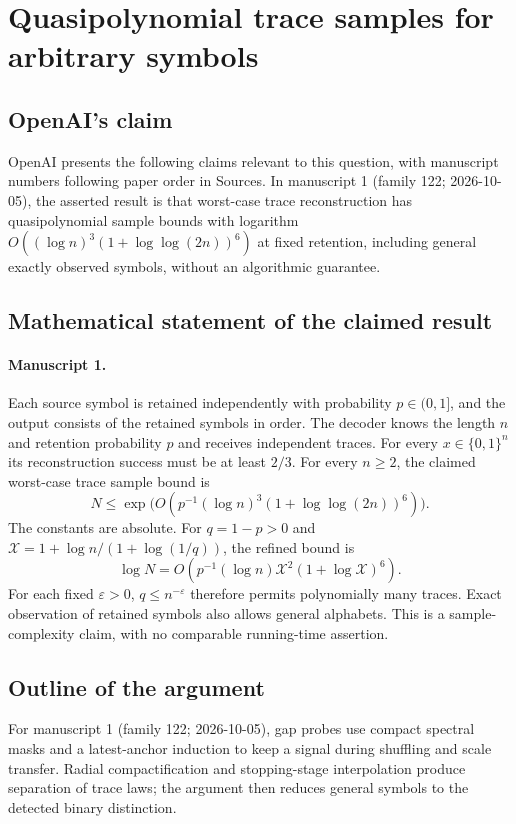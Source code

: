 \documentclass[11pt]{article}
\begin{document}
\section*{Quasipolynomial trace samples for arbitrary symbols}

\subsection{OpenAI's claim}
OpenAI presents the following claims relevant to this question, with manuscript numbers following paper order in Sources. In manuscript 1 (family 122; 2026-10-05), the asserted result is that worst-case trace reconstruction has quasipolynomial sample bounds with logarithm $O((\log n)^3(1+\log\log(2n))^6)$ at fixed retention, including general exactly observed symbols, without an algorithmic guarantee.

\subsection{Mathematical statement of the claimed result}
\paragraph{Manuscript 1.}
Each source symbol is retained independently with probability $p\in(0,1]$, and the output consists of the retained symbols in order. The decoder knows the length $n$ and retention probability $p$ and receives independent traces. For every $x\in\{0,1\}^n$ its reconstruction success must be at least $2/3$. For every $n\ge2$, the claimed worst-case trace sample bound is
\[
 N\le\exp\bigl(O(p^{-1}(\log n)^3(1+\log\log(2n))^6)\bigr).
\]
The constants are absolute. For $q=1-p>0$ and $\mathcal X=1+\log n/(1+\log(1/q))$, the refined bound is
\[
 \log N=O(p^{-1}(\log n)\mathcal X^2(1+\log\mathcal X)^6).
\]
For each fixed $\varepsilon>0$, $q\le n^{-\varepsilon}$ therefore permits polynomially many traces. Exact observation of retained symbols also allows general alphabets. This is a sample-complexity claim, with no comparable running-time assertion.

\subsection{Outline of the argument}
For manuscript 1 (family 122; 2026-10-05), gap probes use compact spectral masks and a latest-anchor induction to keep a signal during shuffling and scale transfer. Radial compactification and stopping-stage interpolation produce separation of trace laws; the argument then reduces general symbols to the detected binary distinction.
\end{document}
